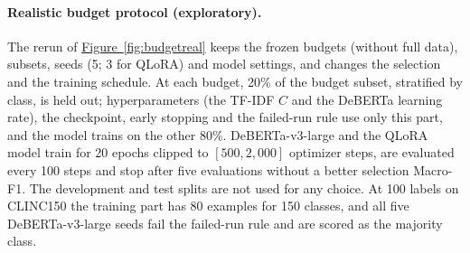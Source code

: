 \begin{table}[htbp]
  \centering
  \caption{\textbf{With 500 task labels, a QLoRA adapter lifts Qwen3.5-4B above both its frozen version and Tev1-4B on
  every dataset (descriptive; fixed schedule).} Macro-F1 difference (Qwen3.5-4B + QLoRA $-$ comparison system), percentage points, with
  95\% bootstrap intervals over seeds (3) and test examples. (a) frozen Qwen3.5-4B; (c) Tev1-4B. Same prompt, assistant
  prefix and readout for all three.}
  \label{tab:qlorabase}
  \scriptsize
  \setlength{\tabcolsep}{4pt}
  
\end{table}

\begin{table}[htbp]
  \centering
  \caption{\textbf{At 100 labels, a third of the CLINC150 classes have no training example.} Classes with at least one
  training example and the range of examples per class over the five subset seeds; the QLoRA subsets are those of the
  first three seeds.}
  \label{tab:shots}
  \scriptsize
  
\end{table}

\begin{table}[htbp]
  \centering
  \caption{\textbf{DeBERTa-v3-large is strongly underconfident at intermediate budgets on the intent datasets
  (descriptive).} Mean top-label probability (confidence) and accuracy on the test set, both within the candidate sets,
  averaged over the five seeds.}
  \label{tab:debconf}
  \scriptsize
  
\end{table}

\paragraph{Realistic budget protocol (exploratory).} The rerun of
\hyperref[fig:budgetreal]{Figure~\ref*{fig:budgetreal}} keeps the frozen budgets (without full data), subsets, seeds
(5; 3 for QLoRA) and model settings, and changes the selection and the training schedule. At each budget, 20\% of the budget subset,
stratified by class, is held out; hyperparameters (the TF-IDF $C$ and the DeBERTa learning rate), the checkpoint, early
stopping and the failed-run rule use only this part, and the model trains on the other 80\%. DeBERTa-v3-large and the
QLoRA model train for 20 epochs clipped to $[500, 2{,}000]$ optimizer steps, are evaluated every 100 steps and stop
after five evaluations without a better selection Macro-F1. The development and test splits are not used for any
choice. At 100 labels on CLINC150 the training part has 80 examples for 150 classes, and all five DeBERTa-v3-large seeds
fail the failed-run rule and are scored as the majority class.

